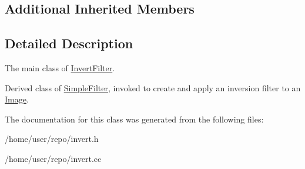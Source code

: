 \subsection*{Additional Inherited Members}


\subsection{Detailed Description}
The main class of \hyperlink{classInvertFilter}{Invert\+Filter}. 

Derived class of \hyperlink{classSimpleFilter}{Simple\+Filter}, invoked to create and apply an inversion filter to an \hyperlink{classImage}{Image}. 

The documentation for this class was generated from the following files\+:\begin{DoxyCompactItemize}
\item 
/home/user/repo/invert.\+h\item 
/home/user/repo/invert.\+cc\end{DoxyCompactItemize}

